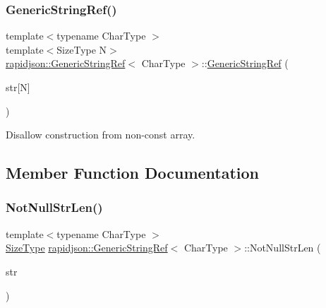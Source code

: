 \subsubsection{\texorpdfstring{GenericStringRef()}{GenericStringRef()}\hspace{0.1cm}{\footnotesize\ttfamily [5/5]}}
{\footnotesize\ttfamily template$<$typename Char\+Type $>$ \\
template$<$Size\+Type N$>$ \\
\mbox{\hyperlink{structrapidjson_1_1_generic_string_ref}{rapidjson\+::\+Generic\+String\+Ref}}$<$ Char\+Type $>$\+::\mbox{\hyperlink{structrapidjson_1_1_generic_string_ref}{Generic\+String\+Ref}} (\begin{DoxyParamCaption}\item[{Char\+Type(\&)}]{str\mbox{[}\+N\mbox{]} }\end{DoxyParamCaption})\hspace{0.3cm}{\ttfamily [private]}}



Disallow construction from non-\/const array. 



\subsection{Member Function Documentation}
\mbox{\label{structrapidjson_1_1_generic_string_ref_a256d24bd0bf99047c025c12d8ec2e10f}} 
\subsubsection{\texorpdfstring{NotNullStrLen()}{NotNullStrLen()}}
{\footnotesize\ttfamily template$<$typename Char\+Type $>$ \\
\mbox{\hyperlink{namespacerapidjson_a44eb33eaa523e36d466b1ced64b85c84}{Size\+Type}} \mbox{\hyperlink{structrapidjson_1_1_generic_string_ref}{rapidjson\+::\+Generic\+String\+Ref}}$<$ Char\+Type $>$\+::Not\+Null\+Str\+Len (\begin{DoxyParamCaption}\item[{const Char\+Type $\ast$}]{str }\end{DoxyParamCaption})\hspace{0.3cm}{\ttfamily [private]}}



